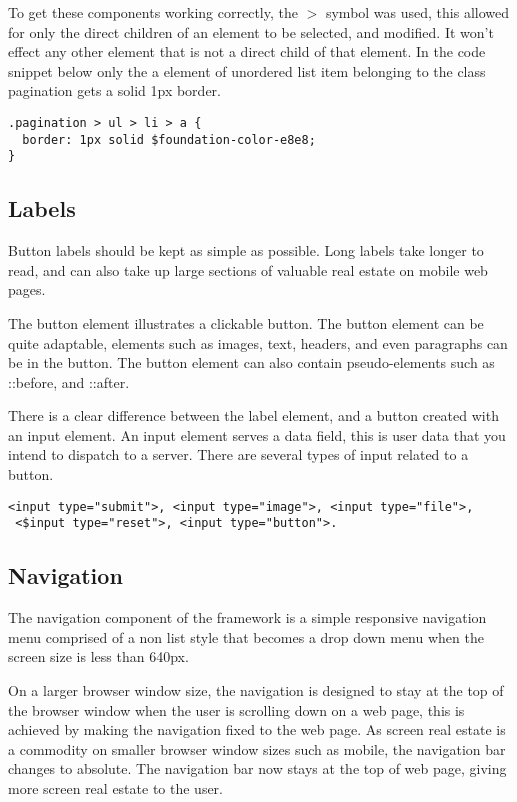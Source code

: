 To get these components working correctly, the $>$ symbol was used, this allowed for only the direct children of an element to be selected, and modified. It won't effect any other element that is not a direct child of that element. In the code snippet below only the a element of unordered list item belonging to the class pagination gets a solid 1px border.   

\begin{lstlisting}[language=CSS3]
.pagination > ul > li > a {
  border: 1px solid $foundation-color-e8e8;
}
\end{lstlisting}

\subsection*{Labels}
Button labels should be kept as simple as possible. Long labels take longer to read, and can also take up large sections of valuable real estate on mobile web pages. 

The button element illustrates a clickable button. The button element can be quite adaptable, elements such as images, text, headers, and even paragraphs can be in the button. The button element can also contain pseudo-elements such as ::before, and ::after. 

There is a clear difference between the label element, and a button created with an input element. An input element serves a data field, this is user data that you intend to dispatch to a server. There are several types of input related to a button.

\begin{lstlisting}[language=CSS3]
 <input type="submit">, <input type="image">, <input type="file">, 
 <$input type="reset">, <input type="button">. 
\end{lstlisting}


\newpage
\subsection*{Navigation}
The navigation component of the framework is a simple responsive navigation menu  comprised of a non list style that becomes a drop down menu when the screen size is less than 640px.

On a larger browser window size, the navigation is designed to stay at the top of the browser window when the user is scrolling down on a web page, this is achieved by making the navigation fixed to the web page. As screen real estate is a commodity on smaller browser window sizes such as mobile, the navigation bar changes to absolute. The navigation bar now stays at the top of web page, giving more screen real estate to the user. 

